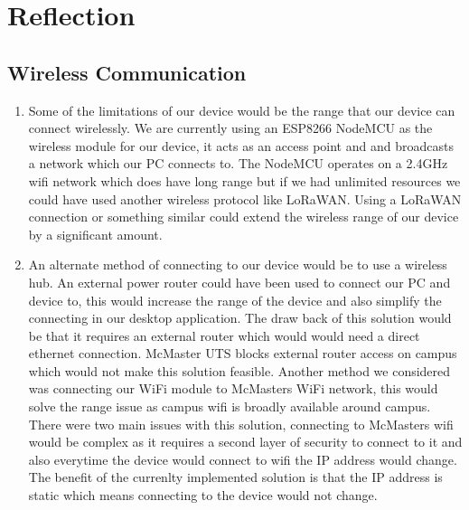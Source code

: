 \documentclass[12pt, titlepage]{article}
\begin{document}
\newpage
\section{Reflection}
\subsection{Wireless Communication}
\begin{enumerate}
  \item Some of the limitations of our device would be the range that our device can connect wirelessly. We are currently using an ESP8266 NodeMCU as the wireless module for our device, it acts as an access point and and broadcasts a network which our PC connects to. The NodeMCU operates on a 2.4GHz wifi network which does have long range but if we had unlimited resources we could have used another wireless protocol like LoRaWAN. Using a LoRaWAN connection or something similar could extend the wireless range of our device by a significant amount.
  \item An alternate method of connecting to our device would be to use a wireless hub. An external power router could have been used to connect our PC and device to, this would increase the range of the device and also simplify the connecting in our desktop application. The draw back of this solution would be that it requires an external router which would would need a direct ethernet connection. McMaster UTS blocks external router access on campus which would not make this solution feasible. Another method we considered was connecting our WiFi module to McMasters WiFi network, this would solve the range issue as campus wifi is broadly available around campus. There were two main issues with this solution, connecting to McMasters wifi would be complex as it requires a second layer of security to connect to it and also everytime the device would connect to wifi the IP address would change. The benefit of the currenlty implemented solution is that the IP address is static which means connecting to the device would not change. 
  
\end{enumerate}
\end{document}
